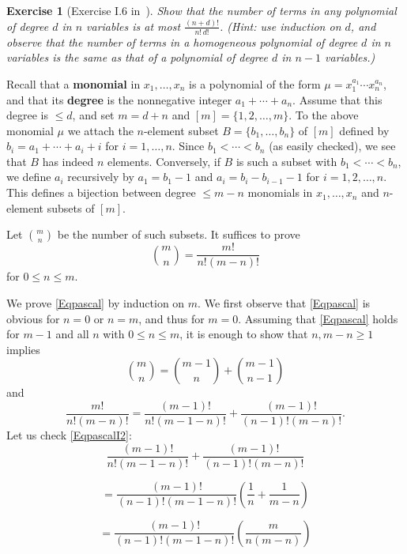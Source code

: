 \documentclass[12pt,letterpaper]{article}
\newtheorem{exer}[thm]{Exercise}
\theoremstyle{definition}
\begin{document}
\begin{exer}[Exercise I.6 in~\cite{weil1979}]
Show that the number of terms in any polynomial of degree $d$ in $n$ variables is at most $\frac{(n+d)!}{n!\,d!}$. (Hint: use induction on $d$, and observe that the number of terms in a homogeneous polynomial of degree $d$ in $n$ variables is the same as that of a polynomial of degree $d$ in $n-1$ variables.) 
\end{exer} 

Recall that a \textbf{monomial} in $x_1,\ldots,x_n$ is a polynomial of the form $\mu=x_1^{a_1}\cdots x_n^{a_n}$, and that its \textbf{degree} is the nonnegative integer $a_1+\cdots+a_n$. Assume that this degree is $\le d$, and set $m=d+n$ and $[m]=\{1,2,\ldots,m\}$. To the above monomial $\mu$ we attach the $n$-element subset $B=\{b_1,\ldots,b_n\}$ of $[m]$ defined by $b_i=a_1+\cdots+a_i+i$ for $i=1,\ldots,n$. Since $b_1<\cdots<b_n$ (as easily checked), we see that $B$ has indeed $n$ elements. Conversely, if $B$ is such a subset with $b_1<\cdots<b_n$, we define $a_i$ recursively by $a_1=b_1-1$ and $a_i=b_i-b_{i-1}-1$ for $i=1,2,\ldots,n$. This defines a bijection between degree $\le m-n$ monomials in $x_1,\ldots,x_n$ and $n$-element subsets of $[m]$. 

Let $\binom{m}{n}$ be the number of such subsets. It suffices to prove 
\begin{equation}\label{Eqpascal}
\binom{m}{n}=\frac{m!}{n!(m-n)!}
\end{equation} 
for $0\le n\le m$. 

We prove \eqref{Eqpascal} by induction on $m$. We first observe that \eqref{Eqpascal} is obvious for $n=0$ or $n=m$, and thus for $m=0$. Assuming that \eqref{Eqpascal} holds for $m-1$ and all $n$ with $0\le n\le m$, it is enough to show that $n,m-n\ge1$ implies 
\begin{equation}\label{EqpascalI1}
\binom{m}{n}=\binom{m-1}{n}+\binom{m-1}{n-1}
\end{equation} 
and 
\begin{equation}\label{EqpascalI2}
\frac{m!}{n!(m-n)!}=\frac{(m-1)!}{n!(m-1-n)!}+\frac{(m-1)!}{(n-1)!(m-n)!}.
\end{equation} 
Let us check \eqref{EqpascalI2}: 
$$
\frac{(m-1)!}{n!(m-1-n)!}+\frac{(m-1)!}{(n-1)!(m-n)!}
$$ 

$$
=\frac{(m-1)!}{(n-1)!(m-1-n)!}\left(\frac{1}{n}+\frac{1}{m-n}\right)
$$ 

$$
=\frac{(m-1)!}{(n-1)!(m-1-n)!}\left(\frac{m}{n(m-n)}\right)
$$ 
\end{document}
